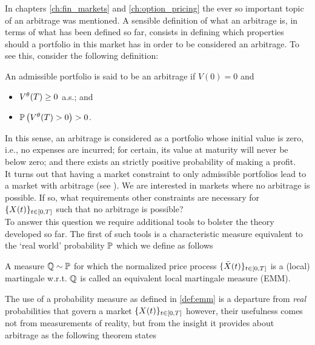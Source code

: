 \documentclass[../TGMAFFIRO.tex]{subfiles}
\begin{document}
In chapters \ref{ch:fin_markets} and \ref{ch:option_pricing} the ever so important topic of an arbitrage was mentioned. A sensible definition of what an arbitrage is, in terms of what has been defined so far, consists in defining which properties should a portfolio in this market has in order to be considered an arbitrage. To see this, consider the following definition:

\begin{definition}
	An admissible portfolio is said to be an arbitrage if $V(0) = 0$ and
	\begin{itemize}
		\item $V^\theta(T) \geq 0$ a.s.; and
		\item $\mathbb{P}\left(V^\theta(T) > 0 \right) > 0$.
	\end{itemize}
\end{definition}

In this sense, an arbitrage is considered as a portfolio whose initial value is zero, i.e., no expenses are incurred; for certain, its value at maturity will never be below zero; and there exists an strictly positive probability of making a profit.\\

It turns out that having a market constraint to only admissible portfolios lead to a market with arbitrage (see ). We are interested in markets where no arbitrage is possible. If so, what requirements other constraints are necessary for $\{X(t)\}_{t\in[0,T]}$ such that no arbitrage is possible?\\

To answer this question we require additional tools to bolster the theory developed so far. The first of such tools is a characteristic measure equivalent to the `real world' probability $\mathbb{P}$ which we define as follows

\begin{definition} \label{def:emm}
	A measure $\mathbb{Q} \sim \mathbb{P}$ for which the normalized price process $\{\bar{X}(t)\}_{t\in[0,T]}$ is a (local) martingale w.r.t. $\mathbb{Q}$ is called an equivalent local martingale measure (EMM).
\end{definition}

The use of a probability measure as defined in \ref{def:emm} is a departure from \textit{real} probabilities that govern a market $\{X(t)\}_{t\in[0,T]}$ however, their usefulness comes not from measurements of reality, but from the insight it provides about arbitrage as the following theorem states
\end{document}
